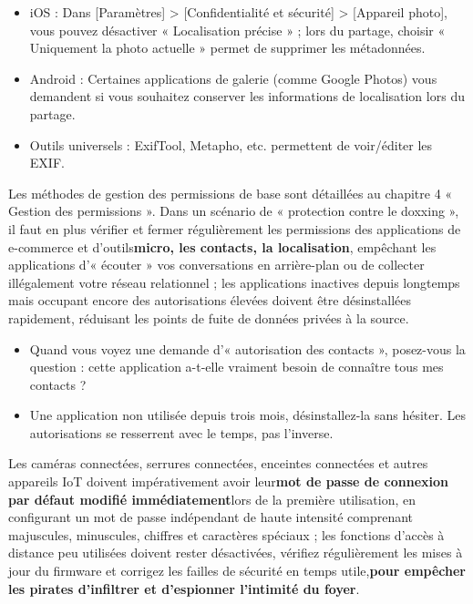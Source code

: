 \begin{itemize}
  \item iOS : Dans [Paramètres] > [Confidentialité et sécurité] > [Appareil photo], vous pouvez désactiver « Localisation précise » ; lors du partage, choisir « Uniquement la photo actuelle » permet de supprimer les métadonnées.
  \item Android : Certaines applications de galerie (comme Google Photos) vous demandent si vous souhaitez conserver les informations de localisation lors du partage.
  \item Outils universels : ExifTool, Metapho, etc. permettent de voir/éditer les EXIF.
\end{itemize}


Les méthodes de gestion des permissions de base sont détaillées au chapitre 4 « Gestion des permissions ». Dans un scénario de « protection contre le doxxing », il faut en plus vérifier et fermer régulièrement les permissions des applications de e-commerce et d'outils\textbf{micro, les contacts, la localisation}, empêchant les applications d'« écouter » vos conversations en arrière-plan ou de collecter illégalement votre réseau relationnel ; les applications inactives depuis longtemps mais occupant encore des autorisations élevées doivent être désinstallées rapidement, réduisant les points de fuite de données privées à la source.

\begin{itemize}
  \item Quand vous voyez une demande d'« autorisation des contacts », posez-vous la question : cette application a-t-elle vraiment besoin de connaître tous mes contacts ?
  \item Une application non utilisée depuis trois mois, désinstallez-la sans hésiter. Les autorisations se resserrent avec le temps, pas l'inverse.
\end{itemize}


Les caméras connectées, serrures connectées, enceintes connectées et autres appareils IoT doivent impérativement avoir leur\textbf{mot de passe de connexion par défaut modifié immédiatement}lors de la première utilisation, en configurant un mot de passe indépendant de haute intensité comprenant majuscules, minuscules, chiffres et caractères spéciaux ; les fonctions d'accès à distance peu utilisées doivent rester désactivées, vérifiez régulièrement les mises à jour du firmware et corrigez les failles de sécurité en temps utile,\textbf{pour empêcher les pirates d'infiltrer et d'espionner l'intimité du foyer}.

